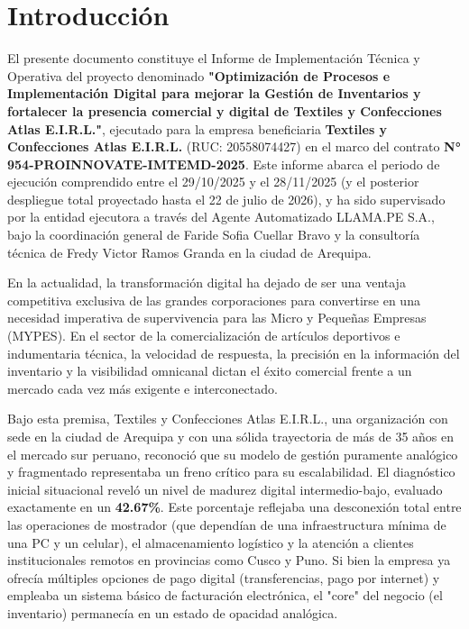 \section{Introducción}

El presente documento constituye el Informe de Implementación Técnica y Operativa del proyecto denominado \textbf{"Optimización de Procesos e Implementación Digital para mejorar la Gestión de Inventarios y fortalecer la presencia comercial y digital de Textiles y Confecciones Atlas E.I.R.L."}, ejecutado para la empresa beneficiaria \textbf{Textiles y Confecciones Atlas E.I.R.L.} (RUC: 20558074427) en el marco del contrato \textbf{N° 954-PROINNOVATE-IMTEMD-2025}. Este informe abarca el periodo de ejecución comprendido entre el 29/10/2025 y el 28/11/2025 (y el posterior despliegue total proyectado hasta el 22 de julio de 2026), y ha sido supervisado por la entidad ejecutora a través del Agente Automatizado LLAMA.PE S.A., bajo la coordinación general de Faride Sofia Cuellar Bravo y la consultoría técnica de Fredy Victor Ramos Granda en la ciudad de Arequipa.

En la actualidad, la transformación digital ha dejado de ser una ventaja competitiva exclusiva de las grandes corporaciones para convertirse en una necesidad imperativa de supervivencia para las Micro y Pequeñas Empresas (MYPES). En el sector de la comercialización de artículos deportivos e indumentaria técnica, la velocidad de respuesta, la precisión en la información del inventario y la visibilidad omnicanal dictan el éxito comercial frente a un mercado cada vez más exigente e interconectado. 

Bajo esta premisa, Textiles y Confecciones Atlas E.I.R.L., una organización con sede en la ciudad de Arequipa y con una sólida trayectoria de más de 35 años en el mercado sur peruano, reconoció que su modelo de gestión puramente analógico y fragmentado representaba un freno crítico para su escalabilidad. El diagnóstico inicial situacional reveló un nivel de madurez digital intermedio-bajo, evaluado exactamente en un \textbf{42.67\%}. Este porcentaje reflejaba una desconexión total entre las operaciones de mostrador (que dependían de una infraestructura mínima de una PC y un celular), el almacenamiento logístico y la atención a clientes institucionales remotos en provincias como Cusco y Puno. Si bien la empresa ya ofrecía múltiples opciones de pago digital (transferencias, pago por internet) y empleaba un sistema básico de facturación electrónica, el "core" del negocio (el inventario) permanecía en un estado de opacidad analógica.

